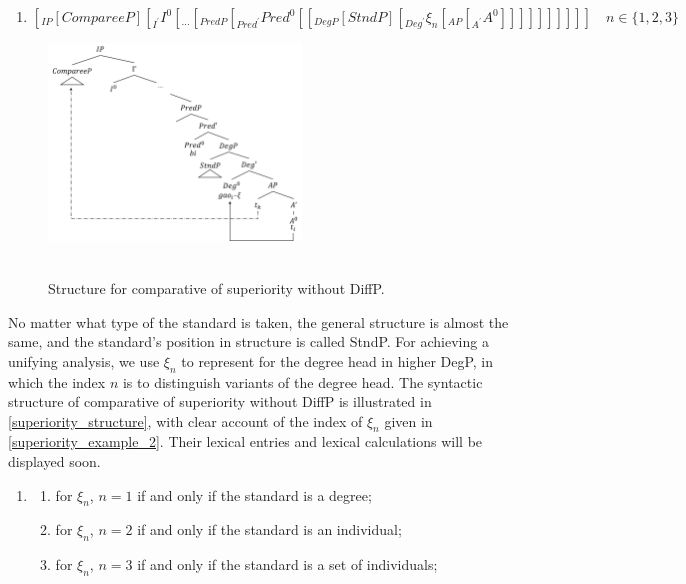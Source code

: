 \documentclass{ctexart}
\begin{document}
\begin{enumerate}
    \item \label{superiority_structure}
    $[_{IP} [CompareeP] [_{I^{\prime}} I^{0} [_{...}[_{PredP}[_{Pred^{\prime}} Pred^0 [[_{DegP} [StndP] [_{Deg^{\prime}} \xi_{n} [_{AP} [_{A^{\prime}} A^{0}]]]]]]]]]] \quad n \in \{1, 2, 3\}$
\end{enumerate}

\begin{figure}[H]
    \centering
    \includegraphics[width=0.6\textwidth]{pic/superiority_structure.png}
    \begin{caption}
        \\ \vspace{-1.1ex}
        Structure for comparative of superiority without DiffP.
    \end{caption}
\end{figure}

No matter what type of the standard is taken, the general structure is almost the same, and the standard's position in structure is called StndP. For achieving a unifying analysis, we use $\xi_n$ to represent for the degree head in higher DegP, in which the index $n$ is to distinguish variants of the degree head. The syntactic structure of comparative of superiority without DiffP is illustrated in \ref{superiority_structure}, with clear account of the index of $\xi_n$ given in \ref{superiority_example_2}. Their lexical entries and lexical calculations will be displayed soon.

\begin{enumerate}
    \item \label{superiority_example_2}
    \begin{enumerate}
        \item \label{superiority_example_2_a}
        for $\xi_n$, $n=1$ if and only if the standard is a degree;

        \item \label{superiority_example_2_b}
        for $\xi_n$, $n=2$ if and only if the standard is an individual;

        \item \label{superiority_example_2_c}
        for $\xi_n$, $n=3$ if and only if the standard is a set of individuals;

    \end{enumerate}
\end{enumerate}
\end{document}
